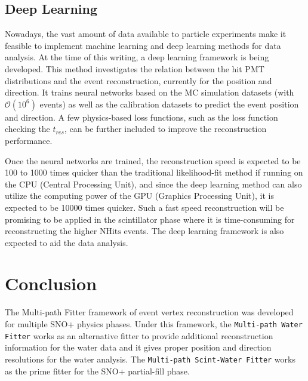 \subsection{Deep Learning}
Nowadays, the vast amount of data available to particle experiments make it feasible to implement machine learning and deep learning methods for data analysis. At the time of this writing, a deep learning framework is being developed\cite{markMachineLearning,markNeuralTalk,markNeuralNetwork}. This method investigates the relation between the hit PMT distributions and the event reconstruction, currently for the position and direction. It trains neural networks based on the MC simulation datasets (with $\mathcal{O}(10^6)$ events) as well as the calibration datasets to predict the event position and direction\cite{markNeuralTalk}. A few physics-based loss functions, such as the loss function checking the $t_{res}$, can be further included to improve the reconstruction performance\cite{markNeuralTalk}. 

Once the neural networks are trained, the reconstruction speed is expected to be 100 to 1000 times quicker than the traditional likelihood-fit method if running on the CPU (Central Processing Unit), and since the deep learning method can also utilize the computing power of the GPU (Graphics Processing Unit), it is expected to be 10000 times quicker\cite{markNeuralTalk,markNeuralNetwork}. Such a fast speed reconstruction will be promising to be applied in the scintillator phase where it is time-consuming for reconstructing the higher $\mathrm{NHits}$ events. The deep learning framework is also expected to aid the data analysis.

\section{Conclusion}
The Multi-path Fitter framework of event vertex reconstruction was developed for multiple SNO+ physics phases. Under this framework, the \texttt{Multi-path Water Fitter} works as an alternative fitter to provide additional reconstruction information for the water data and it gives proper position and direction resolutions for the water analysis. The \texttt{Multi-path Scint-Water Fitter} works as the prime fitter for the SNO+ partial-fill phase.